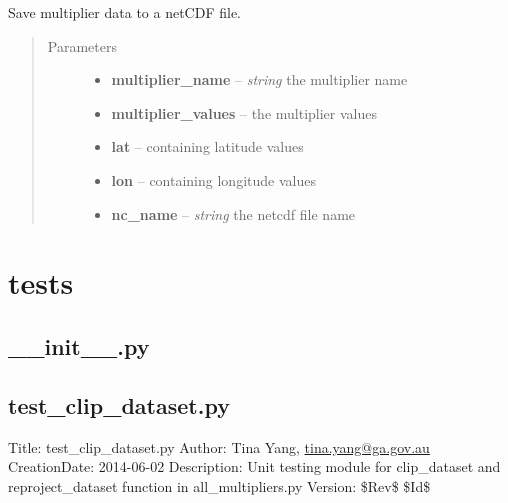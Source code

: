 \documentclass[letterpaper,10pt,english]{sphinxmanual}
\begin{document}

\begin{fulllineitems}
\label{docs/utilities:nctools.save_multiplier}
Save multiplier data to a netCDF file.
\begin{quote}\begin{description}
\item[{Parameters}] \leavevmode\begin{itemize}
\item {} 
\textbf{multiplier\_name} -- \emph{string} the multiplier name

\item {} 
\textbf{multiplier\_values} --  the multiplier values

\item {} 
\textbf{lat} --  containing latitude values

\item {} 
\textbf{lon} --  containing longitude values

\item {} 
\textbf{nc\_name} -- \emph{string} the netcdf file name

\end{itemize}

\end{description}\end{quote}

\end{fulllineitems}



\section{tests}
\label{docs/tests:tests}\label{docs/tests::doc}

\subsection{\_\_init\_\_.py}
\label{docs/tests:init-py}\label{docs/tests:module-__init__}

\subsection{test\_clip\_dataset.py}
\label{docs/tests:test-clip-dataset-py}\label{docs/tests:module-test_clip_dataset}
Title: test\_clip\_dataset.py 
Author: Tina Yang, \href{mailto:tina.yang@ga.gov.au}{tina.yang@ga.gov.au} 
CreationDate: 2014-06-02
Description: Unit testing module for clip\_dataset and reproject\_dataset
function in all\_multipliers.py 
Version: \$Rev\$ 
\$Id\$
\end{document}
